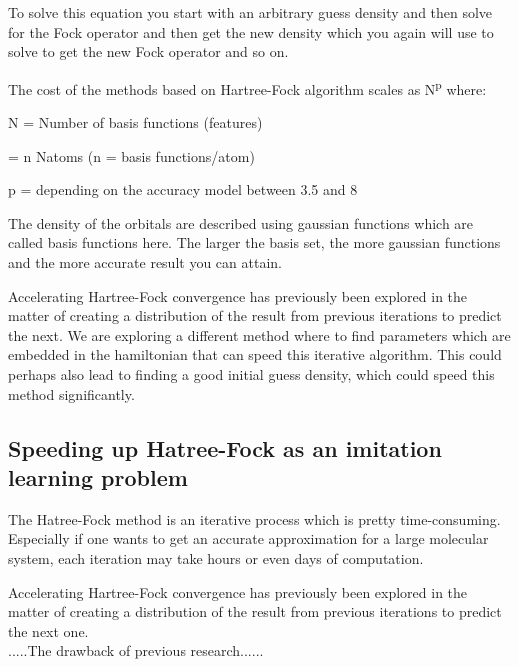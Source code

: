 \documentclass[twoside]{article}
\begin{document}
To solve this equation you start with an arbitrary guess density and then solve for the Fock operator and then get the new density which you again will use to solve to get the new Fock operator and so on. 

The cost of the methods based on Hartree-Fock algorithm scales as N\textsuperscript{p} where: 

N = Number of basis functions (features) 

= n Natoms  (n = basis functions/atom)  

p  = depending on the accuracy model between 3.5 and 8\cite{frisch1996exploring}

The density of the orbitals are described using gaussian functions which are called basis functions here. The larger the basis set, the more gaussian functions and the more accurate result you can attain.

Accelerating Hartree-Fock convergence has previously been explored in the matter of creating a distribution of the result from previous iterations to predict the next\cite{Pulay1980}. We are exploring a different method where to find parameters which are embedded in the hamiltonian that can speed this iterative algorithm. This could perhaps also lead to finding a good initial guess density, which could speed this method significantly. 




\subsection{Speeding up Hatree-Fock as an imitation learning problem}

The Hatree-Fock method is an iterative process which is pretty time-consuming. Especially if one wants to get an accurate approximation for a large molecular system, each iteration may take  hours or even days of computation. 

Accelerating Hartree-Fock convergence has previously been explored in the matter of creating a distribution of the result from previous iterations to predict the next one\cite{Pulay1980}.  \\
.....The drawback of previous research......


\end{document}
